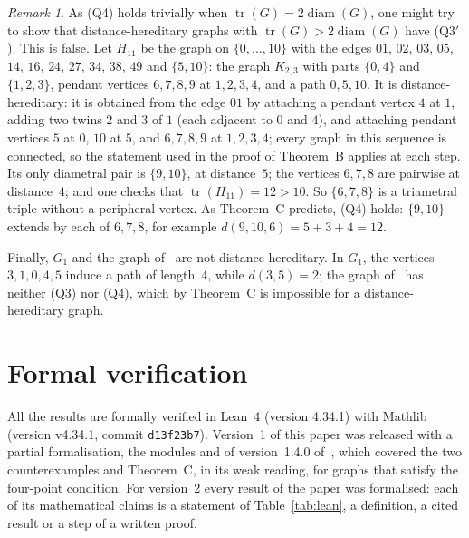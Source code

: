 \documentclass[11pt]{article}
\theoremstyle{remark}
\newtheorem{remark}[theorem]{Remark}
\DeclareMathOperator{\diam}{diam}
\DeclareMathOperator{\tr}{tr}
\newcommand{\QA}{\textup{(Q3)}}
\newcommand{\QAp}{\textup{(Q3$'$)}}
\newcommand{\QB}{\textup{(Q4)}}
\begin{document}
\begin{remark}\label{rem:h11}
As \QB{} holds trivially when $\tr(G)=2\diam(G)$, one might try to show that
distance-hereditary graphs with $\tr(G)>2\diam(G)$ have \QAp. This is false. Let $H_{11}$ be the graph on $\{0,\dots,10\}$ with the
edges $01$, $02$, $03$, $05$, $14$, $16$, $24$, $27$, $34$, $38$, $49$
and $\{5,10\}$: the graph $K_{2,3}$ with parts $\{0,4\}$ and $\{1,2,3\}$, pendant
vertices $6,7,8,9$ at $1,2,3,4$, and a path $0,5,10$. It is
distance-hereditary: it is obtained from the edge $01$ by attaching a pendant
vertex $4$ at $1$, adding two twins $2$ and $3$ of $1$ (each adjacent to $0$
and $4$), and attaching pendant vertices $5$ at $0$, $10$ at $5$, and
$6,7,8,9$ at $1,2,3,4$; every graph in this sequence is connected, so the
statement used in the proof of Theorem~B applies at each step. Its only diametral pair is $\{9,10\}$, at
distance~$5$; the vertices $6,7,8$ are pairwise at distance~$4$; and one checks
that $\tr(H_{11})=12>10$. So $\{6,7,8\}$ is a triametral triple without a
peripheral vertex. As Theorem~C predicts, \QB{} holds: $\{9,10\}$ extends by
each of $6,7,8$, for example $d(9,10,6)=5+3+4=12$.
\end{remark}

Finally, $G_1$ and the graph of~\cite[Figure~2]{hko} are not
distance-hereditary. In $G_1$, the vertices $3,1,0,4,5$ induce a path of
length~$4$, while $d(3,5)=2$; the graph of~\cite[Figure~2]{hko} has neither
\QA{} nor \QB, which by Theorem~C is impossible for a distance-hereditary
graph.

\section{Formal verification}\label{sec:lean}
All the results are formally verified in Lean~4 (version 4.34.1) with
Mathlib~\cite{mathlib} (version v4.34.1, commit \texttt{d13f23b7}).
Version~1 of this paper was released with a partial formalisation, the modules
 and  of version~1.4.0
of~\cite{repo}, which covered the two counterexamples and Theorem~C, in its
weak reading, for graphs that satisfy the four-point condition. For
version~2 every result of the paper was formalised: each of its mathematical
claims is a statement of Table~\ref{tab:lean}, a definition, a cited result
or a step of a written proof.
\end{document}
